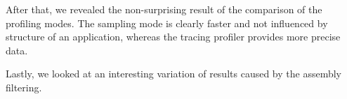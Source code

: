 After that, we revealed the non-surprising result of the comparison of the profiling modes. The sampling mode is clearly faster and not influenced by structure of an application, whereas the tracing profiler provides more precise data.

Lastly, we looked at an interesting variation of results caused by the assembly filtering.

